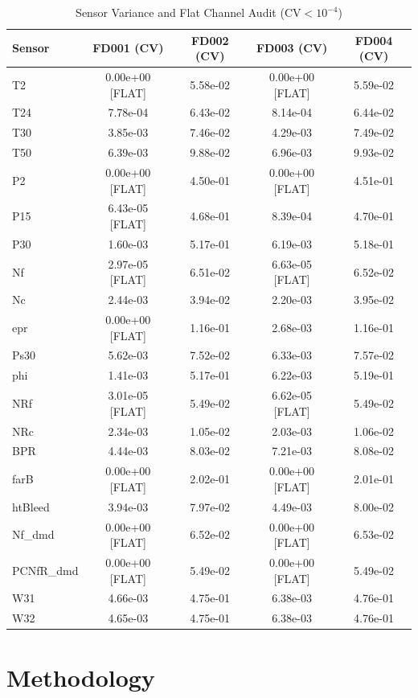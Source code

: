 \documentclass[conference]{IEEEtran}
\begin{document}
\begin{table}[htbp]
\caption{Sensor Variance and Flat Channel Audit ($\text{CV} < 10^{-4}$)}
\label{tab:variance}
\centering
\begin{tabular}{lcccc}
\toprule
Sensor & FD001 (CV) & FD002 (CV) & FD003 (CV) & FD004 (CV) \\
\midrule
T2 & 0.00e+00 [FLAT] & 5.58e-02 & 0.00e+00 [FLAT] & 5.59e-02 \\
T24 & 7.78e-04 & 6.43e-02 & 8.14e-04 & 6.44e-02 \\
T30 & 3.85e-03 & 7.46e-02 & 4.29e-03 & 7.49e-02 \\
T50 & 6.39e-03 & 9.88e-02 & 6.96e-03 & 9.93e-02 \\
P2 & 0.00e+00 [FLAT] & 4.50e-01 & 0.00e+00 [FLAT] & 4.51e-01 \\
P15 & 6.43e-05 [FLAT] & 4.68e-01 & 8.39e-04 & 4.70e-01 \\
P30 & 1.60e-03 & 5.17e-01 & 6.19e-03 & 5.18e-01 \\
Nf & 2.97e-05 [FLAT] & 6.51e-02 & 6.63e-05 [FLAT] & 6.52e-02 \\
Nc & 2.44e-03 & 3.94e-02 & 2.20e-03 & 3.95e-02 \\
epr & 0.00e+00 [FLAT] & 1.16e-01 & 2.68e-03 & 1.16e-01 \\
Ps30 & 5.62e-03 & 7.52e-02 & 6.33e-03 & 7.57e-02 \\
phi & 1.41e-03 & 5.17e-01 & 6.22e-03 & 5.19e-01 \\
NRf & 3.01e-05 [FLAT] & 5.49e-02 & 6.62e-05 [FLAT] & 5.49e-02 \\
NRc & 2.34e-03 & 1.05e-02 & 2.03e-03 & 1.06e-02 \\
BPR & 4.44e-03 & 8.03e-02 & 7.21e-03 & 8.08e-02 \\
farB & 0.00e+00 [FLAT] & 2.02e-01 & 0.00e+00 [FLAT] & 2.01e-01 \\
htBleed & 3.94e-03 & 7.97e-02 & 4.49e-03 & 8.00e-02 \\
Nf\_dmd & 0.00e+00 [FLAT] & 6.52e-02 & 0.00e+00 [FLAT] & 6.53e-02 \\
PCNfR\_dmd & 0.00e+00 [FLAT] & 5.49e-02 & 0.00e+00 [FLAT] & 5.49e-02 \\
W31 & 4.66e-03 & 4.75e-01 & 6.38e-03 & 4.76e-01 \\
W32 & 4.65e-03 & 4.75e-01 & 6.38e-03 & 4.76e-01 \\
\bottomrule
\end{tabular}
\end{table}

\section{Methodology}
\end{document}
